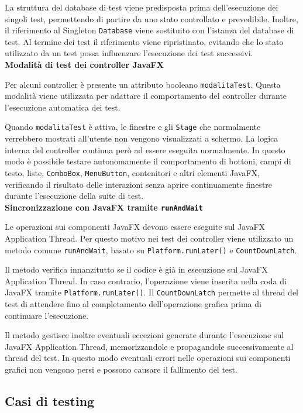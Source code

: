 La struttura del database di test viene predisposta prima dell'esecuzione dei singoli test, permettendo di partire da uno stato controllato e prevedibile. Inoltre, il riferimento al Singleton \texttt{Database} viene sostituito con l'istanza del database di test. Al termine dei test il riferimento viene ripristinato, evitando che lo stato utilizzato da un test possa influenzare l'esecuzione dei test successivi.\\

\textbf{Modalità di test dei controller JavaFX}

Per alcuni controller è presente un attributo booleano \texttt{modalitaTest}. Questa modalità viene utilizzata per adattare il comportamento del controller durante l'esecuzione automatica dei test.

Quando \texttt{modalitaTest} è attiva, le finestre e gli \texttt{Stage} che normalmente verrebbero mostrati all'utente non vengono visualizzati a schermo. La logica interna del controller continua però ad essere eseguita normalmente. In questo modo è possibile testare autonomamente il comportamento di bottoni, campi di testo, liste, \texttt{ComboBox}, \texttt{MenuButton}, contenitori e altri elementi JavaFX, verificando il risultato delle interazioni senza aprire continuamente finestre durante l'esecuzione della suite di test.\\

\textbf{Sincronizzazione con JavaFX tramite \texttt{runAndWait}}

Le operazioni sui componenti JavaFX devono essere eseguite sul JavaFX Application Thread. Per questo motivo nei test dei controller viene utilizzato un metodo comune \texttt{runAndWait}, basato su \texttt{Platform.runLater()} e \texttt{CountDownLatch}.

Il metodo verifica innanzitutto se il codice è già in esecuzione sul JavaFX Application Thread. In caso contrario, l'operazione viene inserita nella coda di JavaFX tramite \texttt{Platform.runLater()}. Il \texttt{CountDownLatch} permette al thread del test di attendere fino al completamento dell'operazione grafica prima di continuare l'esecuzione.

Il metodo gestisce inoltre eventuali eccezioni generate durante l'esecuzione sul JavaFX Application Thread, memorizzandole e propagandole successivamente al thread del test. In questo modo eventuali errori nelle operazioni sui componenti grafici non vengono persi e possono causare il fallimento del test.

\subsection{Casi di testing}

